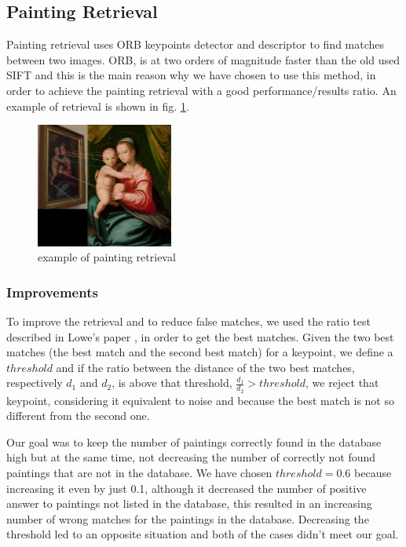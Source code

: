 \subsection{Painting Retrieval}
Painting retrieval uses ORB \cite{orb} keypoints detector and descriptor to find matches between two images. ORB, is at two orders of magnitude faster than the old used SIFT \cite{sift} and this is the main reason why we have chosen to use this method, in order to achieve the painting retrieval with a good performance/results ratio.
An example of retrieval is shown in fig. \ref{fig:retrieval_ex}.
\begin{figure}[h!]
  \centering
      \includegraphics[width=0.4\textwidth]{pictures/painting_retrieval/retrieval}
  \caption{example of painting retrieval}
  \label{fig:retrieval_ex}
\end{figure}

\subsubsection{Improvements}
To improve the retrieval and to reduce false matches, we used the ratio test described in Lowe's paper \cite{sift}, in order to get the best matches. Given the two best matches (the best match and the second best match) for a keypoint, we define a \(threshold\) and if the ratio between the distance of the two best matches, respectively \(d_1\) and \(d_2\), is above that threshold, \(\frac{d_1}{d_2}>threshold\), we reject that keypoint, considering it equivalent to noise and because the best match is not so different from the second one.

Our goal was to keep the number of paintings correctly found in the database high but at the same time, not decreasing the number of correctly not found paintings that are not in the database. We have chosen \(threshold = 0.6\) because increasing it even by just 0.1, although it decreased the number of positive answer to paintings not listed in the database, this resulted in an increasing number of wrong matches for the paintings in the database. Decreasing the threshold led to an opposite situation and both of the cases didn't meet our goal.

